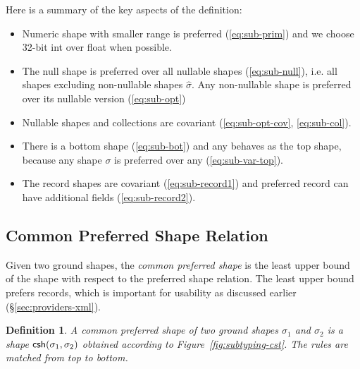 \documentclass[pldi-cameraready]{sigplanconf-pldi16}
\newcommand{\kvd}[1]{\textnormal{\textcolor{kvdclr}{\sffamily #1}}}
\newcommand{\ident}[1]{\textnormal{\sffamily #1}}
\newtheorem{definition}{Definition}
\begin{document}

\noindent
Here is a summary of the key aspects of the definition:
\begin{itemize}
\item Numeric shape with smaller range is preferred (\ref{eq:sub-prim}) and we choose 32-bit
\ident{int} over \ident{float} when possible.

\item The \kvd{null} shape is preferred over all nullable shapes (\ref{eq:sub-null}), i.e.
  all shapes excluding non-nullable shapes $\hat{\sigma}$. Any non-nullable shape is preferred
  over its nullable version (\ref{eq:sub-opt})

\item Nullable shapes and collections are
  covariant (\ref{eq:sub-opt-cov}, \ref{eq:sub-col}).

\item There is a bottom shape (\ref{eq:sub-bot}) and \kvd{any} behaves as the top shape, because
  any shape $\sigma$ is preferred over \kvd{any} (\ref{eq:sub-var-top}).

\item The record shapes are covariant (\ref{eq:sub-record1}) and preferred record can have
  additional fields (\ref{eq:sub-record2}).
\end{itemize}

\noindent


\subsection{Common Preferred Shape Relation}
\label{sec:inference-commonsuper}

Given two ground shapes, the \emph{common preferred shape} is the least upper bound of the
shape with respect to the preferred shape relation. The least upper bound prefers records,
which is important for usability as discussed earlier (\S\ref{sec:providers-xml}).
%
\begin{definition}
A \emph{common preferred shape} of two ground shapes $\sigma_1$ and $\sigma_2$ is a shape
$\ident{csh}(\sigma_1, \sigma_2)$ obtained according to Figure~\ref{fig:subtyping-cst}.
The rules are matched from top to bottom.
\end{definition}
\end{document}

